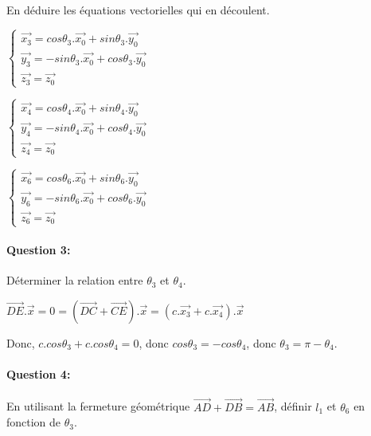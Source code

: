 En déduire les équations vectorielles qui en découlent.

\begin{math}
\left\{\begin{array}{l}
\overrightarrow{x_3}=cos\theta_3.\overrightarrow{x_0}+sin\theta_3.\overrightarrow{y_0}\\
\overrightarrow{y_3}=-sin\theta_3.\overrightarrow{x_0}+cos\theta_3.\overrightarrow{y_0}\\
\overrightarrow{z_3}=\overrightarrow{z_0}
\end{array}\right.
\end{math}

\begin{math}
\left\{\begin{array}{l}
\overrightarrow{x_4}=cos\theta_4.\overrightarrow{x_0}+sin\theta_4.\overrightarrow{y_0}\\
\overrightarrow{y_4}=-sin\theta_4.\overrightarrow{x_0}+cos\theta_4.\overrightarrow{y_0}\\
\overrightarrow{z_4}=\overrightarrow{z_0}
\end{array}\right.
\end{math}

\begin{math}
\left\{\begin{array}{l}
\overrightarrow{x_6}=cos\theta_6.\overrightarrow{x_0}+sin\theta_6.\overrightarrow{y_0}\\
\overrightarrow{y_6}=-sin\theta_6.\overrightarrow{x_0}+cos\theta_6.\overrightarrow{y_0}\\
\overrightarrow{z_6}=\overrightarrow{z_0}
\end{array}\right.
\end{math}

\paragraph{Question 3:} Déterminer la relation entre $\theta_{3}$ et $\theta_{4}$.

$\overrightarrow{DE}.\overrightarrow{x}=0=(\overrightarrow{DC}+\overrightarrow{CE}).\overrightarrow{x}=(c.\overrightarrow{x_3}+c.\overrightarrow{x_4}).\overrightarrow{x}$

Donc, $c.cos\theta_3+c.cos\theta_4=0$, donc $cos\theta_3=-cos\theta_4$, donc $\theta_3=\pi-\theta_4$.

\paragraph{Question 4:} En utilisant la fermeture géométrique $\overrightarrow{AD}+\overrightarrow{DB}=\overrightarrow{AB}$, définir $l_1$ et $\theta_6$ en fonction de $\theta_3$.

